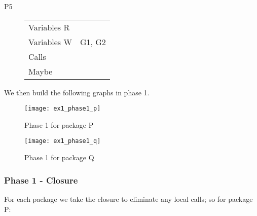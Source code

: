 \documentclass{article}
\begin{document}
\begin{multicols}{2}
\begin{description}
\item[P5]
  \begin{tabular}{ll}
    Variables R & \\
    Variables W & G1, G2 \\
    Calls       & \\
    Maybe       & \\
  \end{tabular}
\end{description}

\end{multicols}

\noindent
We then build the following graphs in phase 1.

\begin{figure}[h]
  \begin{center}
    \texttt{[image: ex1\_phase1\_p]}
  \end{center}
  \caption{Phase 1 for package P}
\end{figure}

\begin{figure}[h]
  \begin{center}
    \texttt{[image: ex1\_phase1\_q]}
  \end{center}
  \caption{Phase 1 for package Q}
\end{figure}

\subsubsection{Phase 1 - Closure}
For each package we take the closure to eliminate any local calls; so for
package P:
\end{document}
